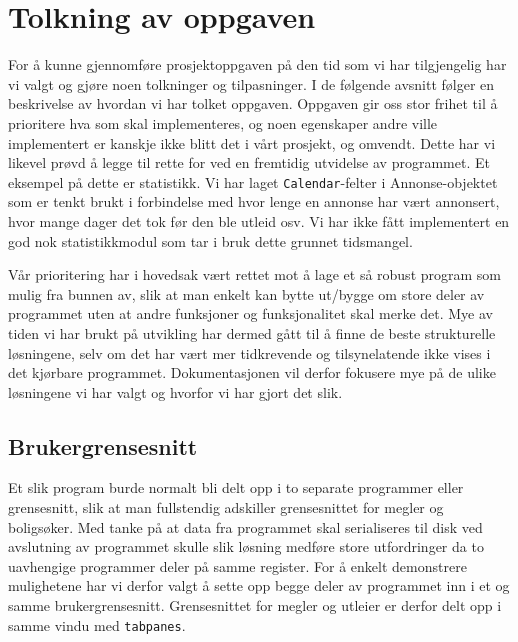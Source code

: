 \section{Tolkning av oppgaven}
For å kunne gjennomføre prosjektoppgaven på den tid som vi har tilgjengelig har vi valgt og gjøre noen tolkninger og tilpasninger. I de følgende avsnitt følger en beskrivelse av hvordan vi har tolket oppgaven.
Oppgaven gir oss stor frihet til å prioritere hva som skal implementeres, og noen egenskaper andre ville implementert er kanskje ikke blitt det i vårt prosjekt, og omvendt. Dette har vi likevel prøvd å legge til rette for ved en fremtidig utvidelse av programmet. 
Et eksempel på dette er statistikk. Vi har laget \texttt{Calendar}-felter i Annonse-objektet som er tenkt brukt i forbindelse med hvor lenge en annonse har vært annonsert, hvor mange dager det tok før den ble utleid osv. Vi har ikke fått implementert en god nok statistikkmodul som tar i bruk dette grunnet tidsmangel.

Vår prioritering har i hovedsak vært rettet mot å lage et så robust program som mulig fra bunnen av, slik at man enkelt kan bytte ut/bygge om store deler av programmet uten at andre funksjoner og funksjonalitet skal merke det.
Mye av tiden vi har brukt på utvikling har dermed gått til å finne de beste strukturelle løsningene, selv om det har vært mer tidkrevende og tilsynelatende ikke vises i det kjørbare programmet. 
Dokumentasjonen vil derfor fokusere mye på de ulike løsningene vi har valgt og hvorfor vi har gjort det slik.

\subsection{Brukergrensesnitt}
Et slik program burde normalt bli delt opp i to separate programmer eller grensesnitt, slik at man fullstendig adskiller grensesnittet for megler og boligsøker. Med tanke på at data fra programmet skal serialiseres til disk ved avslutning av programmet skulle slik løsning medføre store utfordringer da to uavhengige programmer deler på samme register. For å enkelt demonstrere mulighetene har vi derfor valgt å sette opp begge deler av programmet inn i et og samme brukergrensesnitt. Grensesnittet for megler og utleier er derfor delt opp i samme vindu med \texttt{tabpanes}. 

